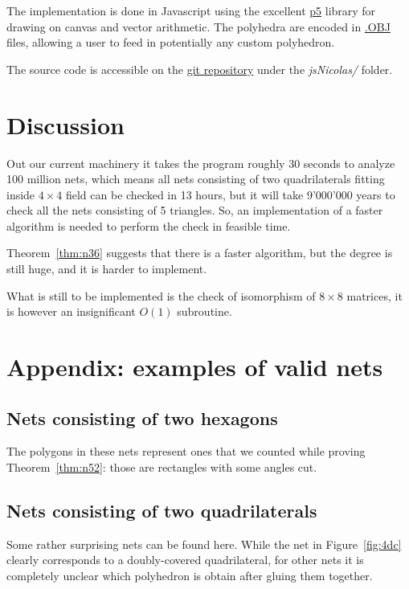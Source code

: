 \documentclass[a4paper,11pt]{article}
\begin{document}
The implementation is done in Javascript using the excellent \href{https://p5js.org/reference/}{p5} library for drawing on canvas and vector arithmetic. The polyhedra are encoded in \href{https://docs.fileformat.com/3d/obj/}{.OBJ} files, allowing a user to feed in potentially any custom polyhedron.

The source code is accessible on the \href{https://github.com/boris-a-zolotov/infof420-geodesics}{git repository} under the \textit{jsNicolas/} folder.

\section{Discussion}

Out our current machinery it takes the program roughly 30 seconds to analyze 100 million nets, which means all nets consisting of two quadrilaterals fitting inside $4 \times 4$ field can be checked in 13 hours, but it will take 9'000'000 years to check all the nets consisting of 5 triangles. So, an implementation of a faster algorithm is needed to perform the check in feasible time.

Theorem~\ref{thm:n36} suggests that there is a faster algorithm, but the degree is still huge, and it is harder to implement.

What is still to be implemented is the check of isomorphism of $8 \times 8$ matrices, it is however an insignificant $O(1)$ subroutine.

\section*{Appendix: examples of valid nets}

\subsection*{Nets consisting of two hexagons}

The polygons in these nets represent ones that we counted while proving Theorem~\ref{thm:n52}: those are rectangles with some angles cut.



\subsection*{Nets consisting of two quadrilaterals}

Some rather surprising nets can be found here. While the net in Figure~\ref{fig:4dc} clearly corresponds to a doubly-covered quadrilateral, for other nets it is completely unclear which polyhedron is obtain after gluing them together.
\end{document}
